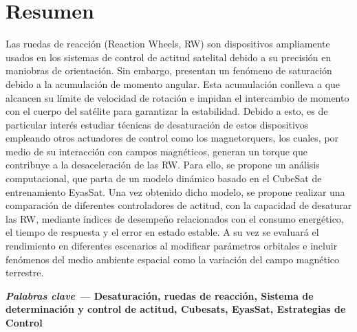 \pagestyle{fancy}
\section*{Resumen}
%

\noindent 
Las ruedas de reacción (Reaction Wheels, RW) son dispositivos ampliamente usados en los sistemas de control de actitud satelital debido a su precisión en maniobras de orientación. Sin embargo, presentan un fenómeno de saturación debido a la acumulación de momento angular. Esta acumulación conlleva a que alcancen su límite de velocidad de rotación e impidan el intercambio de momento con el cuerpo del satélite para garantizar la estabilidad. Debido a esto, es de particular interés estudiar técnicas de desaturación de estos dispositivos empleando otros actuadores de control como los magnetorquers, los cuales, por medio de su interacción con campos magnéticos, generan un torque que contribuye a la desaceleración de las RW. Para ello, se propone un análisis computacional, que parta de un modelo dinámico basado en el CubeSat de entrenamiento EyasSat. Una vez obtenido dicho modelo, se propone realizar una comparación de diferentes controladores de actitud, con la capacidad de desaturar las RW, mediante índices de desempeño relacionados con el consumo energético, el tiempo de respuesta y el error en estado estable. A su vez se evaluará el rendimiento en diferentes escenarios al modificar parámetros orbitales e incluir fenómenos del medio ambiente espacial como la variación del campo magnético terrestre.



\vspace{1cm}\textbf{\textit{Palabras clave ---} Desaturación, ruedas de reacción, Sistema de determinación y control de actitud, Cubesats, EyasSat, Estrategias de Control}




